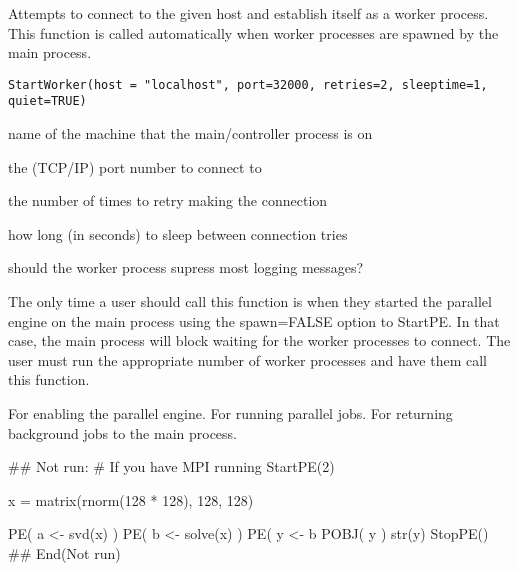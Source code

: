 \begin{Description}\relax
Attempts to connect to the given host and establish itself as a worker
process.  This function is called automatically when worker processes
are spawned by the main process.
\end{Description}
\begin{Usage}
\begin{verbatim}
StartWorker(host = "localhost", port=32000, retries=2, sleeptime=1, quiet=TRUE)
\end{verbatim}
\end{Usage}
\begin{Arguments}
\begin{ldescription}
\item[\code{host}] name of the machine that the main/controller process is on 
\item[\code{port}] the (TCP/IP) port number to connect to 
\item[\code{retries}] the number of times to retry making the connection 
\item[\code{sleeptime}] how long (in seconds) to sleep between connection tries 
\item[\code{quiet}] should the worker process supress most logging messages? 
\end{ldescription}
\end{Arguments}
\begin{Details}\relax
The only time a user should call this function is when they started the
parallel engine on the main process using the spawn=FALSE option to
StartPE.  In that case, the main process will block waiting for the
worker processes to connect.  The user must run the appropriate number
of worker processes and have them call this function.
\end{Details}
\begin{SeeAlso}\relax
{}  For enabling the parallel engine.
        For running parallel jobs.
  For returning background jobs to the main process.
\end{SeeAlso}
\begin{Examples}
\begin{ExampleCode}
## Not run: 
# If you have MPI running
StartPE(2)

x = matrix(rnorm(128 * 128), 128, 128)

PE( a <- svd(x) )
PE( b <- solve(x) )
PE( y <- b %
POBJ( y )
str(y)
StopPE()
## End(Not run)
\end{ExampleCode}
\end{Examples}

